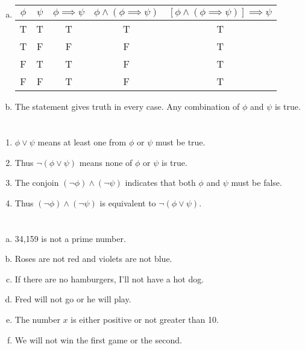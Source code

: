 \documentclass{article}
\begin{document}
\section{}

\begin{enumerate}[(a)]
\item
  \begin{tabular}{ | c | c | c | c | c | }
    \hline
    $\phi$ & $\psi$ & $\phi \implies \psi$ & $\phi \wedge (\phi \implies \psi)$ & $[\phi \wedge (\phi \implies \psi)] \implies \psi$ \\
    \hline
    T & T & T & T & T \\
    T & F & F & F & T \\
    F & T & T & F & T \\
    F & F & T & F & T \\
    \hline
  \end{tabular}
\item
  The statement gives truth in every case. Any combination of $\phi$ and $\psi$ is true.
\end{enumerate}

\section{}

\begin{enumerate}
\item $\phi \vee \psi$ means at least one from $\phi$ or $\psi$ must be true.
\item Thus $\neg(\phi \vee \psi)$ means none of $\phi$ or $\psi$ is true.
\item The conjoin $(\neg\phi) \wedge (\neg\psi)$ indicates that both $\phi$ and
  $\psi$ must be false.
\item Thus $(\neg\phi) \wedge (\neg\psi)$ is equivalent to $\neg(\phi \vee \psi)$.
\end{enumerate}

\section{}

\begin{enumerate}[(a)]
\item 34,159 is not a prime number.
\item Roses are not red and violets are not blue.
\item If there are no hamburgers, I'll not have a hot dog.
\item Fred will not go or he will play.
\item The number $x$ is either positive or not greater than 10.
\item We will not win the first game or the second.
\end{enumerate}
\end{document}
